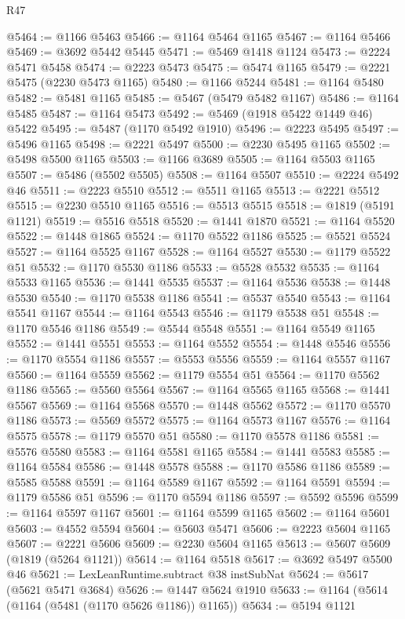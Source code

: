 \begin{lexlean}{R47}
\begin{coremodule}
@5464 := @1166 @5463
@5466 := @1164 @5464 @1165
@5467 := @1164 @5466
@5469 := @3692 @5442 @5445
@5471 := @5469 @1418 @1124
@5473 := @2224 @5471 @5458
@5474 := @2223 @5473
@5475 := @5474 @1165
@5479 := @2221 @5475 (@2230 @5473 @1165)
@5480 := @1166 @5244
@5481 := @1164 @5480
@5482 := @5481 @1165
@5485 := @5467 (@5479 @5482 @1167)
@5486 := @1164 @5485
@5487 := @1164 @5473
@5492 := @5469 (@1918 @5422 @1449 @46) @5422
@5495 := @5487 (@1170 @5492 @1910)
@5496 := @2223 @5495
@5497 := @5496 @1165
@5498 := @2221 @5497
@5500 := @2230 @5495 @1165
@5502 := @5498 @5500 @1165
@5503 := @1166 @3689
@5505 := @1164 @5503 @1165
@5507 := @5486 (@5502 @5505)
@5508 := @1164 @5507
@5510 := @2224 @5492 @46
@5511 := @2223 @5510
@5512 := @5511 @1165
@5513 := @2221 @5512
@5515 := @2230 @5510 @1165
@5516 := @5513 @5515
@5518 := @1819 (@5191 @1121)
@5519 := @5516 @5518
@5520 := @1441 @1870
@5521 := @1164 @5520
@5522 := @1448 @1865
@5524 := @1170 @5522 @1186
@5525 := @5521 @5524
@5527 := @1164 @5525 @1167
@5528 := @1164 @5527
@5530 := @1179 @5522 @51
@5532 := @1170 @5530 @1186
@5533 := @5528 @5532
@5535 := @1164 @5533 @1165
@5536 := @1441 @5535
@5537 := @1164 @5536
@5538 := @1448 @5530
@5540 := @1170 @5538 @1186
@5541 := @5537 @5540
@5543 := @1164 @5541 @1167
@5544 := @1164 @5543
@5546 := @1179 @5538 @51
@5548 := @1170 @5546 @1186
@5549 := @5544 @5548
@5551 := @1164 @5549 @1165
@5552 := @1441 @5551
@5553 := @1164 @5552
@5554 := @1448 @5546
@5556 := @1170 @5554 @1186
@5557 := @5553 @5556
@5559 := @1164 @5557 @1167
@5560 := @1164 @5559
@5562 := @1179 @5554 @51
@5564 := @1170 @5562 @1186
@5565 := @5560 @5564
@5567 := @1164 @5565 @1165
@5568 := @1441 @5567
@5569 := @1164 @5568
@5570 := @1448 @5562
@5572 := @1170 @5570 @1186
@5573 := @5569 @5572
@5575 := @1164 @5573 @1167
@5576 := @1164 @5575
@5578 := @1179 @5570 @51
@5580 := @1170 @5578 @1186
@5581 := @5576 @5580
@5583 := @1164 @5581 @1165
@5584 := @1441 @5583
@5585 := @1164 @5584
@5586 := @1448 @5578
@5588 := @1170 @5586 @1186
@5589 := @5585 @5588
@5591 := @1164 @5589 @1167
@5592 := @1164 @5591
@5594 := @1179 @5586 @51
@5596 := @1170 @5594 @1186
@5597 := @5592 @5596
@5599 := @1164 @5597 @1167
@5601 := @1164 @5599 @1165
@5602 := @1164 @5601
@5603 := @4552 @5594
@5604 := @5603 @5471
@5606 := @2223 @5604 @1165
@5607 := @2221 @5606
@5609 := @2230 @5604 @1165
@5613 := @5607 @5609 (@1819 (@5264 @1121))
@5614 := @1164 @5518
@5617 := @3692 @5497 @5500 @46
@5621 := LexLeanRuntime.subtract @38 instSubNat
@5624 := @5617 (@5621 @5471 @3684)
@5626 := @1447 @5624 @1910
@5633 := @1164 (@5614 (@1164 (@5481 (@1170 @5626 @1186)) @1165))
@5634 := @5194 @1121

\end{coremodule}
\end{lexlean}
